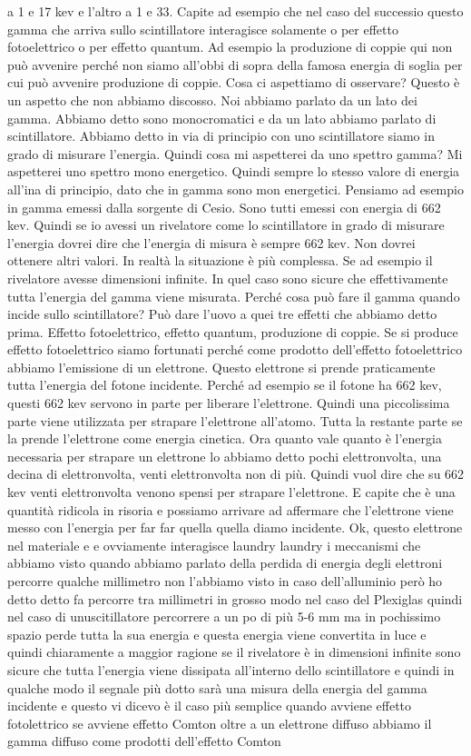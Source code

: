 a 1 e 17 kev e l'altro a 1 e 33. Capite ad esempio che nel caso del successio questo gamma che arriva sullo scintillatore interagisce solamente o per effetto fotoelettrico o per effetto quantum. Ad esempio la produzione di coppie qui non può avvenire perché non siamo all'obbi di sopra della famosa energia di soglia per cui può avvenire produzione di coppie. Cosa ci aspettiamo di osservare? Questo è un aspetto che non abbiamo discosso. Noi abbiamo parlato da un lato dei gamma. Abbiamo detto sono monocromatici e da un lato abbiamo parlato di scintillatore. Abbiamo detto in via di principio con uno scintillatore siamo in grado di misurare l'energia. Quindi cosa mi aspetterei da uno spettro gamma? Mi aspetterei uno spettro mono energetico. Quindi sempre lo stesso valore di energia all'ina di principio, dato che in gamma sono mon energetici. Pensiamo ad esempio in gamma emessi dalla sorgente di Cesio. Sono tutti emessi con energia di 662 kev. Quindi se io avessi un rivelatore come lo scintillatore in grado di misurare l'energia dovrei dire che l'energia di misura è sempre 662 kev. Non dovrei ottenere altri valori. In realtà la situazione è più complessa. Se ad esempio il rivelatore avesse dimensioni infinite. In quel caso sono sicure che effettivamente tutta l'energia del gamma viene misurata. Perché cosa può fare il gamma quando incide sullo scintillatore? Può dare l'uovo a quei tre effetti che abbiamo detto prima. Effetto fotoelettrico, effetto quantum, produzione di coppie. Se si produce effetto fotoelettrico siamo fortunati perché come prodotto dell'effetto fotoelettrico abbiamo l'emissione di un elettrone. Questo elettrone si prende praticamente tutta l'energia del fotone incidente. Perché ad esempio se il fotone ha 662 kev, questi 662 kev servono in parte per liberare l'elettrone. Quindi una piccolissima parte viene utilizzata per strapare l'elettrone all'atomo. Tutta la restante parte se la prende l'elettrone come energia cinetica. Ora quanto vale quanto è l'energia necessaria per strapare un elettrone lo abbiamo detto pochi elettronvolta, una decina di elettronvolta, venti elettronvolta non di più. Quindi vuol dire che su 662 kev venti elettronvolta venono spensi per strapare l'elettrone. E capite che è una quantità ridicola in risoria e possiamo arrivare ad affermare che l'elettrone viene messo con l'energia per far far quella quella diamo incidente. Ok, questo elettrone nel materiale e e ovviamente interagisce laundry laundry i meccanismi che abbiamo visto quando abbiamo parlato della perdida di energia degli elettroni percorre qualche millimetro non l'abbiamo visto in caso dell'alluminio però ho detto detto fa percorre tra millimetri in grosso modo nel caso del Plexiglas quindi nel caso di unuscitillatore percorrere a un po di più 5-6 mm ma in pochissimo spazio perde tutta la sua energia e questa energia viene convertita in luce e quindi chiaramente a maggior ragione se il rivelatore è in dimensioni infinite sono sicure che tutta l'energia viene dissipata all'interno dello scintillatore e quindi in qualche modo il segnale più dotto sarà una misura della energia del gamma incidente e questo vi dicevo è il caso più semplice quando avviene effetto fotolettrico se avviene effetto Comton oltre a un elettrone diffuso abbiamo il gamma diffuso come prodotti dell'effetto Comton 